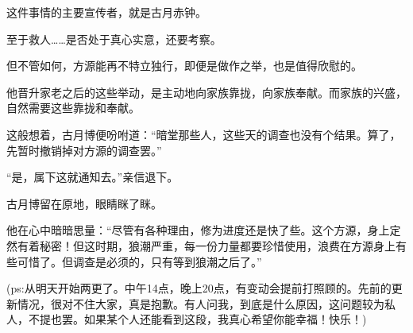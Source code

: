 \begin{this_body}
这件事情的主要宣传者，就是古月赤钟。

至于救人……是否处于真心实意，还要考察。

但不管如何，方源能再不特立独行，即便是做作之举，也是值得欣慰的。

他晋升家老之后的这些举动，是主动地向家族靠拢，向家族奉献。而家族的兴盛，自然需要这些靠拢和奉献。

这般想着，古月博便吩咐道：“暗堂那些人，这些天的调查也没有个结果。算了，先暂时撤销掉对方源的调查罢。”

“是，属下这就通知去。”亲信退下。

古月博留在原地，眼睛眯了眯。

他在心中暗暗思量：“尽管有各种理由，修为进度还是快了些。这个方源，身上定然有着秘密！但这时期，狼潮严重，每一份力量都要珍惜使用，浪费在方源身上有些可惜了。但调查是必须的，只有等到狼潮之后了。”

(ps:从明天开始两更了。中午14点，晚上20点，有变动会提前打照顾的。先前的更新情况，很对不住大家，真是抱歉。有人问我，到底是什么原因，这问题较为私人，不提也罢。如果某个人还能看到这段，我真心希望你能幸福！快乐！)

\end{this_body}

